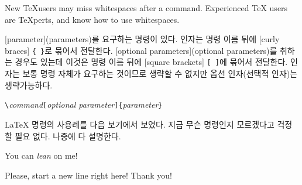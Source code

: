 \begin{example}
New \TeX users may miss whitespaces
after a command. %
Experienced \TeX{} users are
\TeX perts, and know how to use
whitespaces. %
\end{example}


[parameter](parameters)를 요구하는 명령이 있다. 인자는 명령 이름 뒤에 [curly braces] \verb|{ }|로 묶어서 전달한다.
[optional parameters](optional parameters)를 취하는 경우도 있는데 이것은 명령 이름 뒤에 [square brackets] \verb|[ ]|에 묶어서 전달한다.
인자는 보통 명령 자체가 요구하는 것이므로 생략할 수 없지만 옵션 인자(선택적 인자)는 생략가능하다.
\begin{code}
\verb|\|\textit{command}\verb|[|\textit{optional parameter}\verb|]{|\textit{parameter}\verb|}|
\end{code}
\LaTeX{} 명령의 사용례를 다음 보기에서 보였다. 지금 무슨 명령인지 모르겠다고 걱정할 필요 없다. 나중에 다 설명한다.

\begin{example}
You can \textsl{lean} on me!
\end{example}

\vspace{-.5\onelineskip}

\begin{example}
Please, start a new line
right here!\newline
Thank you!
\end{example}

